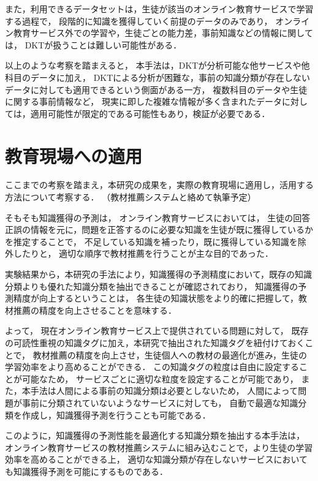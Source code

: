 また，利用できるデータセットは，生徒が該当のオンライン教育サービスで学習する過程で，
段階的に知識を獲得していく前提のデータのみであり，
オンライン教育サービス外での学習や，生徒ごとの能力差，事前知識などの情報に関しては，
DKTが扱うことは難しい可能性がある．


以上のような考察を踏まえると，
本手法は，DKTが分析可能な他サービスや他科目のデータに加え，
DKTによる分析が困難な，事前の知識分類が存在しないデータに対しても適用できるという側面がある一方，
複数科目のデータや生徒に関する事前情報など，
現実に即した複雑な情報が多く含まれたデータに対しては，適用可能性が限定的である可能性もあり，検証が必要である．


\section{教育現場への適用}
ここまでの考察を踏まえ，本研究の成果を，実際の教育現場に適用し，活用する方法について考察する．
（教材推薦システムと絡めて執筆予定）

そもそも知識獲得の予測は，
オンライン教育サービスにおいては，
生徒の回答正誤の情報を元に，問題を正答するのに必要な知識を生徒が既に獲得しているかを推定することで，
不足している知識を補ったり，既に獲得している知識を除外したりと，
適切な順序で教材推薦を行うことが主な目的であった．

実験結果から，本研究の手法により，知識獲得の予測精度において，既存の知識分類よりも優れた知識分類を抽出できることが確認されており，
知識獲得の予測精度が向上するということは，
各生徒の知識状態をより的確に把握して，教材推薦の精度を向上させることを意味する．

よって，
現在オンライン教育サービス上で提供されている問題に対して，
既存の可読性重視の知識タグに加え，本研究で抽出された知識タグを紐付けておくことで，
教材推薦の精度を向上させ，生徒個人への教材の最適化が進み，生徒の学習効率をより高めることができる．
この知識タグの粒度は自由に設定することが可能なため，
サービスごとに適切な粒度を設定することが可能であり，
また，本手法は人間による事前の知識分類は必要としないため，
人間によって問題が事前に分類されていないようなサービスに対しても，
自動で最適な知識分類を作成し，知識獲得予測を行うことも可能である．


このように，知識獲得の予測性能を最適化する知識分類を抽出する本手法は，
オンライン教育サービスの教材推薦システムに組み込むことで，より生徒の学習効率を高めることができる上，
適切な知識分類が存在しないサービスにおいても知識獲得予測を可能にするものである．


